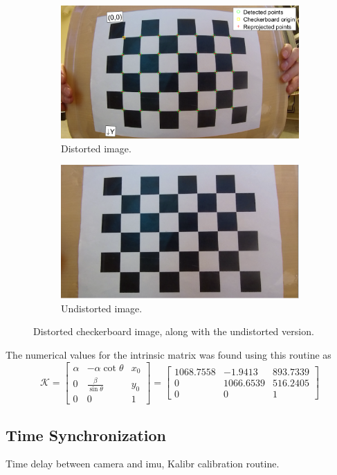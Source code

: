 \begin{figure}[H]
	\centering
	\begin{subfigure}{.5\textwidth}
		\centering
		\includegraphics[width=.8\linewidth]{fig/calibration_distorted.PNG}
		\caption{Distorted image.}
		\label{fig:sub_distort1}
	\end{subfigure}%
	\begin{subfigure}{.5\textwidth}
		\centering
		\includegraphics[width=.8\linewidth]{fig/calibration_undistorted.PNG}
		\caption{Undistorted image.}
		\label{fig:sub_distort2}
	\end{subfigure}
	\caption{Distorted checkerboard image, along with the undistorted version.}
	\label{fig:distortion}
\end{figure}
The numerical values for the intrinsic matrix was found using this routine as
\begin{equation}
\mathcal{K}=\begin{bmatrix}\alpha & -\alpha\cot{\theta} & x_0\\0 & \frac{\beta}{\sin{\theta}} & y_0\\0 & 0 & 1\end{bmatrix}=\begin{bmatrix}
1068.7558 & -1.9413 & 893.7339 \\ 0 & 1066.6539 &516.2405\\ 0 & 0 & 1
\end{bmatrix}
\end{equation}  
\subsection{Time Synchronization}
Time delay between camera and imu, Kalibr calibration routine.
\cleardoublepage